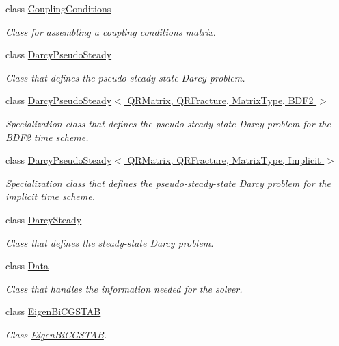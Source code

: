\begin{DoxyCompactItemize}
class \hyperlink{classFVCode3D_1_1CouplingConditions}{Coupling\+Conditions}
\begin{DoxyCompactList}\small\item\em Class for assembling a coupling conditions matrix. \end{DoxyCompactList}\item 
class \hyperlink{classFVCode3D_1_1DarcyPseudoSteady}{Darcy\+Pseudo\+Steady}
\begin{DoxyCompactList}\small\item\em Class that defines the pseudo-\/steady-\/state Darcy problem. \end{DoxyCompactList}\item 
class \hyperlink{classFVCode3D_1_1DarcyPseudoSteady_3_01QRMatrix_00_01QRFracture_00_01MatrixType_00_01BDF2_01_4}{Darcy\+Pseudo\+Steady$<$ Q\+R\+Matrix, Q\+R\+Fracture, Matrix\+Type, B\+D\+F2 $>$}
\begin{DoxyCompactList}\small\item\em Specialization class that defines the pseudo-\/steady-\/state Darcy problem for the B\+D\+F2 time scheme. \end{DoxyCompactList}\item 
class \hyperlink{classFVCode3D_1_1DarcyPseudoSteady_3_01QRMatrix_00_01QRFracture_00_01MatrixType_00_01Implicit_01_4}{Darcy\+Pseudo\+Steady$<$ Q\+R\+Matrix, Q\+R\+Fracture, Matrix\+Type, Implicit $>$}
\begin{DoxyCompactList}\small\item\em Specialization class that defines the pseudo-\/steady-\/state Darcy problem for the implicit time scheme. \end{DoxyCompactList}\item 
class \hyperlink{classFVCode3D_1_1DarcySteady}{Darcy\+Steady}
\begin{DoxyCompactList}\small\item\em Class that defines the steady-\/state Darcy problem. \end{DoxyCompactList}\item 
class \hyperlink{classFVCode3D_1_1Data}{Data}
\begin{DoxyCompactList}\small\item\em Class that handles the information needed for the solver. \end{DoxyCompactList}\item 
class \hyperlink{classFVCode3D_1_1EigenBiCGSTAB}{Eigen\+Bi\+C\+G\+S\+T\+AB}
\begin{DoxyCompactList}\small\item\em Class \hyperlink{classFVCode3D_1_1EigenBiCGSTAB}{Eigen\+Bi\+C\+G\+S\+T\+AB}. \end{DoxyCompactList}\item 

\end{DoxyCompactItemize}
